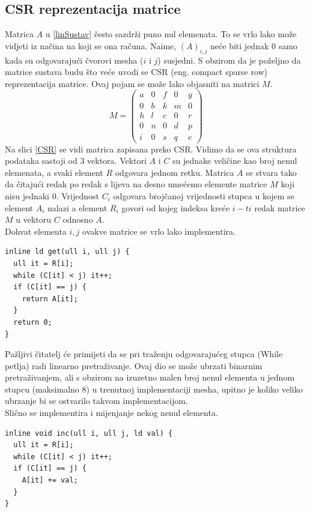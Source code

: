 \documentclass[zavrsnirad]{../fer}
\begin{document}
\subsection{CSR reprezentacija matrice}
Matrica $A$ u \ref{linSustav} 
često sazdrži puno nul elemenata. To se vrlo lako može 
vidjeti iz načina na koji se ona računa. Naime, $(A)_{i,j}$ 
neće biti jednak $0$ samo kada su odgovarajući čvorovi 
mesha ($i$ i $j$) susjedni. S obzirom da je poželjno da
matrice sustava budu što veće uvodi se CSR (eng. compact sparse row)
reprezentacija matrice. Ovaj pojam se može lako objasniti na matrici $M$.
$$M = \begin{pmatrix}
  a & 0 & f & 0 & g\\ 
  0 & b & k & m & 0\\ 
  h & l & c & 0 & r\\ 
  0 & n & 0 & d & p\\ 
  i & 0 & s & q & e
\end{pmatrix}$$
Na slici \ref{CSR} 
se vidi matrica zapisana preko CSR. Vidimo da se
ova struktura podataka sastoji od 3 vektora. 
Vektori $A$ i $C$ su jednake veličine kao broj nenul 
elemenata, a svaki element $R$ odgovara jednom retku.
Matrica $A$ se stvara tako da čitajući redak po redak
s lijeva na desno umećemo elemente matrice $M$ koji 
nisu jednaki $0$. Vrijednost $C_i$ odgovara brojčanoj
vrijednosti stupca u kojem se element $A_i$ nalazi 
a element $R_i$ govori od kojeg indeksa kreće $i-ti$
redak matrice $M$ u vektoru $C$ odnosno $A$. 
\\ 
\bigskip
Dohvat elementa $i,j$ ovakve matrice se vrlo lako implementira.
\begin{verbatim}
inline ld get(ull i, ull j) {
  ull it = R[i];
  while (C[it] < j) it++;
  if (C[it] == j) {
    return A[it];
  }
  return 0;
}
\end{verbatim}
Pažljivi čitatelj će primijeti da se pri traženju odgovarajućeg
stupca (While petlja) radi linearno pretraživanje. Ovaj dio 
se može ubrzati binarnim pretraživanjem, ali s obzirom na 
izuzetno malen broj nenul elementa u jednom stupcu (maksimalno $8$)
u trenutnoj implementaciji mesha, upitno je koliko veliko ubrzanje 
bi se ostvarilo takvom implementacijom.
\\ 
\bigskip
Slično se implementira i mijenjanje nekog nenul elementa.
\begin{verbatim}
inline void inc(ull i, ull j, ld val) {
  ull it = R[i];
  while (C[it] < j) it++;
  if (C[it] == j) {
    A[it] += val;
  }
}
\end{verbatim}
\end{document}
